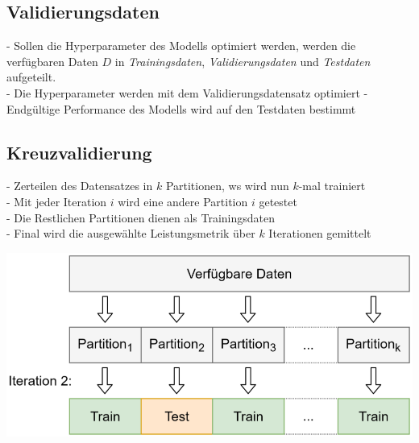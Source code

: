 \documentclass{report}
\begin{document}
  \subsection{Validierungsdaten}	
  - Sollen die Hyperparameter des Modells optimiert werden, werden die verfügbaren Daten $D$	
  in \textit{Trainingsdaten}, \textit{Validierungsdaten} und \textit{Testdaten} aufgeteilt.\\	
  - Die Hyperparameter werden mit dem Validierungsdatensatz optimiert	
  - Endgültige Performance des Modells wird auf den Testdaten bestimmt	
  
  \subsection{Kreuzvalidierung}	
  - Zerteilen des Datensatzes in $k$ Partitionen, ws wird nun $k$-mal trainiert\\	
  - Mit jeder Iteration $i$ wird eine andere Partition $i$ getestet\\	
  - Die Restlichen Partitionen dienen als Trainingsdaten\\	
  - Final wird die ausgewählte Leistungsmetrik über $k$ Iterationen gemittelt	
  \begin{center}	
    \includegraphics[scale=.225]{ml02_9}	
  \end{center}	
  
\end{document}
